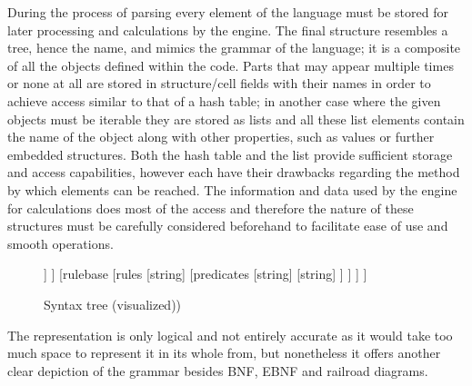 During the process of parsing every element of the language must be stored for later processing and calculations by the engine. The final structure resembles a tree, hence the name, and mimics the grammar of the language; it is a composite of all the objects defined within the code. Parts that may appear multiple times or none at all are stored in structure/cell fields with their names in order to achieve access similar to that of a hash table; in another case where the given objects must be iterable they are stored as lists and all these list elements contain the name of the object along with other properties, such as values or further embedded structures. Both the hash table and the list provide sufficient storage and access capabilities, however each have their drawbacks regarding the method by which elements can be reached. The information and data used by the engine for calculations does most of the access and therefore the nature of these structures must be carefully considered beforehand to facilitate ease of use and smooth operations.

\begin{figure}[!h]
	\centering
	\begin{forest}
		 [behavior
		 	[universe
				[symbol
					[string]
					[number]
					[number]
				]
			]
		 	[rulebase
				[rules
					[string]
					[predicates
						[string]
						[string]
					]
				]
			]
		 ]
	\end{forest}
	\caption{Syntax tree (visualized))}
\end{figure}

The representation is only logical and not entirely accurate as it would take too much space to represent it in its whole from, but nonetheless it offers another clear depiction of the grammar besides BNF, EBNF and railroad diagrams.

